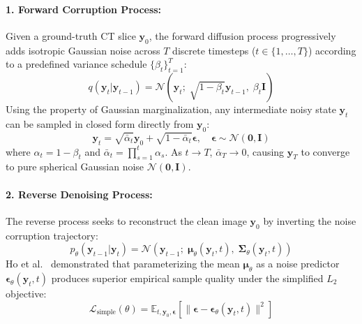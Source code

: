 \paragraph{1. Forward Corruption Process:}
Given a ground-truth CT slice $\mathbf{y}_0$, the forward diffusion process progressively adds isotropic Gaussian noise across $T$ discrete timesteps ($t \in \{1, \dots, T\}$) according to a predefined variance schedule $\{\beta_t\}_{t=1}^T$:
\begin{equation}
q(\mathbf{y}_t | \mathbf{y}_{t-1}) = \mathcal{N}\left( \mathbf{y}_t; \; \sqrt{1 - \beta_t}\mathbf{y}_{t-1}, \; \beta_t \mathbf{I} \right)
\label{eq:forward_step}
\end{equation}
Using the property of Gaussian marginalization, any intermediate noisy state $\mathbf{y}_t$ can be sampled in closed form directly from $\mathbf{y}_0$:
\begin{equation}
\mathbf{y}_t = \sqrt{\bar{\alpha}_t} \mathbf{y}_0 + \sqrt{1 - \bar{\alpha}_t} \boldsymbol{\epsilon}, \quad \boldsymbol{\epsilon} \sim \mathcal{N}(\mathbf{0}, \mathbf{I})
\label{eq:closed_form_yt}
\end{equation}
where $\alpha_t = 1 - \beta_t$ and $\bar{\alpha}_t = \prod_{s=1}^t \alpha_s$. As $t \to T$, $\bar{\alpha}_T \to 0$, causing $\mathbf{y}_T$ to converge to pure spherical Gaussian noise $\mathcal{N}(\mathbf{0}, \mathbf{I})$.

\paragraph{2. Reverse Denoising Process:}
The reverse process seeks to reconstruct the clean image $\mathbf{y}_0$ by inverting the noise corruption trajectory:
\begin{equation}
p_\theta(\mathbf{y}_{t-1} | \mathbf{y}_t) = \mathcal{N}\left( \mathbf{y}_{t-1}; \; \boldsymbol{\mu}_\theta(\mathbf{y}_t, t), \; \boldsymbol{\Sigma}_\theta(\mathbf{y}_t, t) \right)
\label{eq:reverse_step}
\end{equation}
Ho et al.~\cite{ho2020denoising} demonstrated that parameterizing the mean $\boldsymbol{\mu}_\theta$ as a noise predictor $\boldsymbol{\epsilon}_\theta(\mathbf{y}_t, t)$ produces superior empirical sample quality under the simplified $L_2$ objective:
\begin{equation}
\mathcal{L}_{\text{simple}}(\theta) = \mathbb{E}_{t, \mathbf{y}_0, \boldsymbol{\epsilon}} \left[ \|\boldsymbol{\epsilon} - \boldsymbol{\epsilon}_\theta(\mathbf{y}_t, t)\|^2 \right]
\label{eq:ho_loss}
\end{equation}

